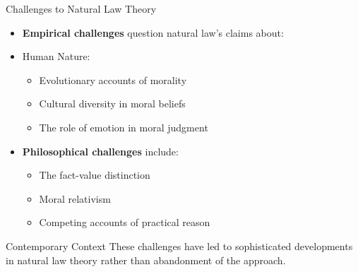\documentclass{beamer}
\begin{document}
\begin{frame}{Challenges to Natural Law Theory}
    \begin{itemize}
        \item \textbf{Empirical challenges} question natural law's claims about:
        
        \item Human Nature:
        \begin{itemize}
            \item Evolutionary accounts of morality
            \item Cultural diversity in moral beliefs
            \item The role of emotion in moral judgment
        \end{itemize}
        
        \item \textbf{Philosophical challenges} include:
            \begin{itemize}
                \item The fact-value distinction
                \item Moral relativism
                \item Competing accounts of practical reason
            \end{itemize}
    \end{itemize}
    
    \begin{alertblock}{Contemporary Context}
        These challenges have led to sophisticated developments in natural law theory rather than abandonment of the approach.
    \end{alertblock}
\end{frame}
\end{document}
